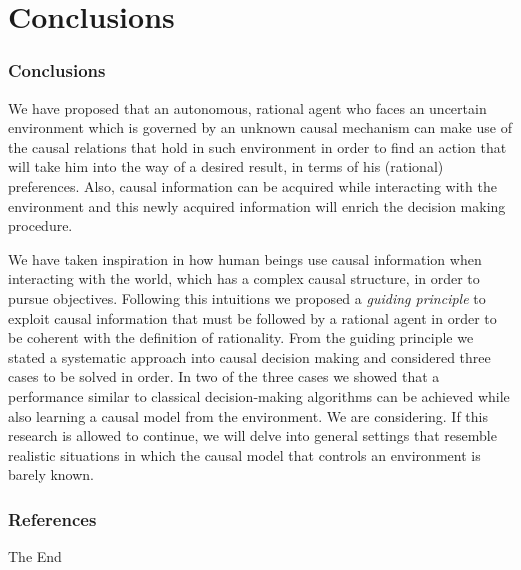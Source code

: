 \documentclass{beamer}
\theoremstyle{plain}
\begin{document}
\section{Conclusions}
\begin{frame}
\frametitle{Conclusions}
We have proposed that an autonomous, rational agent who faces an uncertain environment which is governed by an unknown causal mechanism can make use of the causal relations that hold in such environment in order to find an action that will take him into the way of a desired result, in terms of his (rational) preferences. Also, causal information can be acquired while interacting with the environment and this newly acquired information will enrich the decision making procedure.
\end{frame} 
\begin{frame}
We have taken inspiration in how human beings use causal information when interacting with the world, which has a complex causal structure, in order to pursue objectives. Following this intuitions we proposed a \textit{guiding principle} to exploit causal information that must be followed by a rational agent in order to be coherent with the definition of rationality. From the guiding principle we stated a systematic approach into causal decision making and considered three cases to be solved in order. In two of the three cases we showed that a performance similar to classical decision-making algorithms can be achieved while also learning a causal model from the environment. We are considering. If this research is allowed to continue, we will delve into general settings that resemble realistic situations in which the causal model that controls an environment is barely known.
\end{frame}


\begin{frame}[allowframebreaks]
\frametitle{References}


\end{frame}


\begin{frame}
\Huge{\centerline{The End}}
\end{frame}

\end{document}
